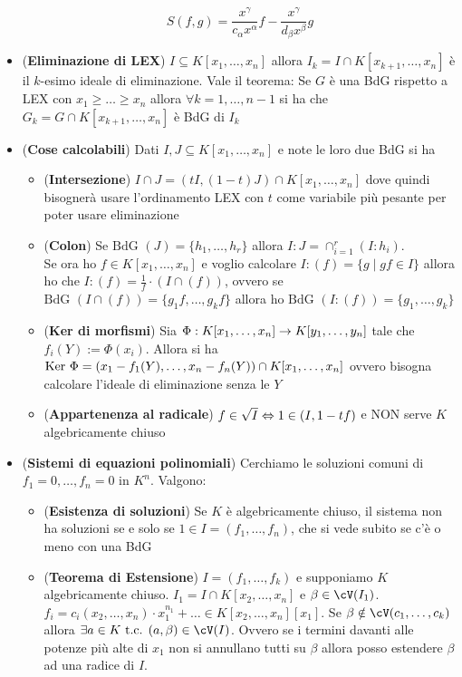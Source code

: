 \documentclass[a4paper,NoNotes,GeneralMath]{stdmdoc}
\newcommand{\BdG}{\text{BdG }}
\begin{document}
\begin{itemize}
			$$ S(f, g) = \frac{x^\gamma}{c_\alpha x^\alpha} f - \frac{x^\gamma}{d_\beta x^\beta} g $$
		\item ({\bf Eliminazione di LEX}) $I \subseteq K[x_1, \ldots, x_n]$ allora $I_k = I \cap K[x_{k+1}, \ldots, x_n]$ è il $k$-esimo ideale di eliminazione. Vale il teorema: Se $G$ è una BdG rispetto a LEX con $x_1 \ge \ldots \ge x_n$ allora $\forall k = 1, \ldots, n-1$ si ha che $G_k = G \cap K[x_{k+1}, \ldots, x_n]$ è BdG di $I_k$
		\item ({\bf Cose calcolabili}) Dati $I, J \subseteq K[x_1, \ldots, x_n]$ e note le loro due BdG si ha
			\begin{itemize}
				\item ({\bf Intersezione}) $I \cap J = (tI, (1-t)J) \cap K[x_1, \ldots, x_n]$ dove quindi bisognerà usare l'ordinamento LEX con $t$ come variabile più pesante per poter usare eliminazione
				\item ({\bf Colon}) Se $\BdG(J) = \{h_1, \ldots, h_r\}$ allora $I : J = \cap_{i=1}^r (I : h_i)$. \\
					Se ora ho $f \in K[x_1, \ldots, x_n]$ e voglio calcolare $I : (f) = \{g \mid gf \in I\}$ allora ho che $I : (f) = \frac{1}{f} \cdot (I\cap (f))$, ovvero se $\BdG(I \cap (f)) = \{g_1 f, \ldots, g_k f\}$ allora ho $\BdG(I : (f)) = \{g_1, \ldots, g_k\}$
				\item ({\bf Ker di morfismi}) Sia $\Phi: K[x_1, \ldots, x_n] \rightarrow K[y_1, \ldots, y_n]$ tale che $f_i(Y) := \Phi(x_i)$. Allora si ha $\mbox{Ker } \Phi = (x_1 - f_1(Y), \ldots, x_n - f_n(Y)) \cap K[x_1, \ldots, x_n]$ ovvero bisogna calcolare l'ideale di eliminazione senza le $Y$
				\item ({\bf Appartenenza al radicale}) $f \in \sqrt{I} \Leftrightarrow 1 \in (I, 1-tf)$ e NON serve $K$ algebricamente chiuso
			\end{itemize}
		\item ({\bf Sistemi di equazioni polinomiali}) Cerchiamo le soluzioni comuni di $f_1 = 0, \ldots, f_n = 0$ in $K^n$. Valgono:
			\begin{itemize}
				\item ({\bf Esistenza di soluzioni}) Se $K$ è algebricamente chiuso, il sistema non ha soluzioni se e solo se $1 \in I = (f_1, \ldots, f_n)$, che si vede subito se c'è o meno con una BdG
				\item ({\bf Teorema di Estensione}) $I = (f_1, \ldots, f_k)$ e supponiamo $K$ algebricamente chiuso. $I_1 = I \cap K[x_2, \ldots, x_n]$ e $\beta \in \cV(I_1)$. $f_i = c_i(x_2, \ldots, x_n) \cdot x_1^{n_1} + \ldots \in K[x_2, \ldots, x_n][x_1]$. Se $\beta \notin \cV(c_1, \ldots, c_k)$ allora $\exists a \in K \tc (a, \beta) \in \cV(I)$. Ovvero se i termini davanti alle potenze più alte di $x_1$ non si annullano tutti su $\beta$ allora posso estendere $\beta$ ad una radice di $I$.

\end{itemize}
\end{itemize}
\end{document}
